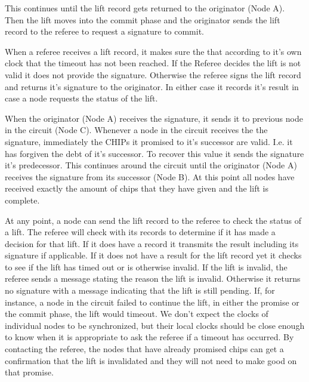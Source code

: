 \documentclass[article, onecolumn, 12pt]{IEEEtran}
\begin{document}
This continues until the lift record gets returned to the originator (Node A). Then the lift moves into the commit phase and the originator sends the lift record to the referee to request a signature to commit. 

When a referee receives a lift record, it makes sure the that according to it's own clock that the timeout has not been reached. If the Referee decides the lift is not valid it does not provide the signature. Otherwise the referee signs the lift record and returns it's signature to the originator. In either case it records it's result in case a node requests the status of the lift.

When the originator (Node A) receives the signature, it sends it to previous node in the circuit (Node C).  Whenever a node in the circuit receives the the signature, immediately the CHIPs it promised to it's successor are valid. I.e. it has forgiven the debt of it's successor. 
To recover this value it sends the signature it's predecessor. This continues around the circuit until the originator (Node A) receives the signature from its successor (Node B). At this point all nodes have received exactly the amount of chips that they have given and the lift is complete.

At any point, a node can send the lift record to the referee to check the status of a lift. The referee will check with its records to determine if it has made a decision for that lift. If it does have a record it transmits the result including its signature if applicable. If it does not have a result for the lift record yet it checks to see if the lift has timed out or is otherwise invalid. If the lift is invalid, the referee sends a message stating the reason the lift is invalid. Otherwise it returns no signature with a message indicating that the lift is still pending. If, for instance, a node in the circuit failed to continue the lift, in either the promise or the commit phase, the lift would timeout. We don't expect the clocks of individual nodes to be synchronized, but their local clocks should be close enough to know when it is appropriate to ask the referee if a timeout has occurred. By contacting the referee, the nodes that have already promised chips can get a confirmation that the lift is invalidated and they will not need to make good on that promise.
\end{document}
